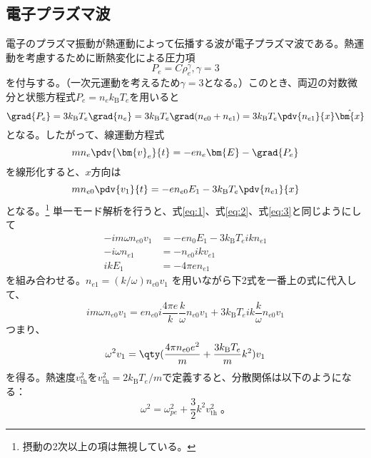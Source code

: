 \subsection{電子プラズマ波}
電子のプラズマ振動が熱運動によって伝播する波が電子プラズマ波である。熱運動を考慮するために断熱変化による圧力項
\begin{equation}
	P_e = C\rho_e^\gamma,\gamma=3
\end{equation}
を付与する。（一次元運動を考えるため$\gamma=3$となる。）このとき、両辺の対数微分と状態方程式$P_e = n_ek_{\text{B}}T_e$を用いると
\begin{equation}
	\grad{P_e} = 3k_{\text{B}}T_e\grad{n_e} = 3k_{\text{B}}T_e\grad(n_{e0} + n_{e1}) = 3k_{\text{B}}T_e\pdv{n_{e1}}{x}\hat{\bm{x}}
\end{equation}
となる。したがって、線運動方程式
\begin{equation}
	mn_e\pdv{\bm{v}_e}{t}= -en_e\bm{E} - \grad{P_e}
\end{equation}
を線形化すると、$x$方向は
\begin{equation}
	mn_{e0}\pdv{v_1}{t} = -en_{e0}E_1 - 3k_{\text{B}}T_e\pdv{n_{e1}}{x}
\end{equation}
となる。\footnote{摂動の2次以上の項は無視している。}
単一モード解析を行うと、式\eqref{eq:1}、式\eqref{eq:2}、式\eqref{eq:3}と同じようにして
\begin{align}
	-im\omega{}n_{e0}v_1 & = -en_0E_1  -3k_{\text{B}}T_eikn_{e1} \\
	-i\omega{}n_{e1}     & = -n_{e0}ikv_{e1}                     \\
	ikE_1                & = -4\pi{}en_{e1}
\end{align}
を組み合わせる。$n_{e1} = (k/{\omega})n_{e0}v_1$
を用いながら下2式を一番上の式に代入して、
\begin{equation}
	im\omega{}n_{e0}v_1  = en_{e0}i\frac{4\pi{}e}{k}\frac{k}{\omega}n_{e0}v_1 + 3k_{\text{B}}T_eik\frac{k}{\omega}n_{e0}v_1
\end{equation}
つまり、
\begin{equation}
	\omega^2v_1 = \qty(\frac{4\pi{}n_{e0}e^2}{m} + \frac{3k_{\text{B}}T_e}{m}k^2)v_1
\end{equation}
を得る。熱速度$v_{\text{th}}^2$を$v_{\text{th}}^2 = 2k_{\text{B}}T_e/m$で定義すると、分散関係は以下のようになる：
\begin{equation}
	\omega^2 = \omega^2_{pe} + \frac{3}{2}k^2v^2_{\text{th}}\;。
\end{equation}

